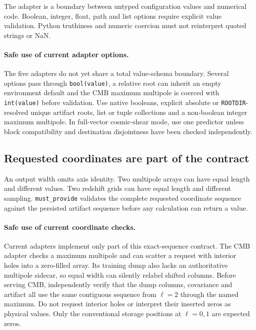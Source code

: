\documentclass[10pt,aps,prd,twocolumn,nofootinbib]{revtex4-2}
\newcommand{\code}[1]{\texttt{#1}}
\begin{document}
The adapter is a boundary between untyped configuration values and numerical
code.  Boolean, integer, float, path and list options require explicit value
validation.  Python truthiness and numeric coercion must not reinterpret quoted
strings or NaN.

\paragraph{Safe use of current adapter options.}
The five adapters do not yet share a total value-schema boundary.  Several
options pass through \code{bool(value)}, a relative root can inherit an empty
environment default and the CMB maximum multipole is coerced with
\code{int(value)} before validation.  Use native booleans, explicit absolute or
\code{ROOTDIR}-resolved unique artifact roots, list or tuple collections and a
non-boolean integer maximum multipole.  In full-vector cosmic-shear mode, use
one predictor unless block compatibility and destination disjointness have
been checked independently.

\subsection{Requested coordinates are part of the contract}

An output width omits axis identity.  Two multipole arrays can have equal length
and different values.  Two redshift grids can have equal length and different
sampling.  \code{must\_provide} validates the complete requested coordinate
sequence against the persisted artifact sequence before any calculation can
return a value.

\paragraph{Safe use of current coordinate checks.}
Current adapters implement only part of this exact-sequence contract.  The CMB
adapter checks a maximum multipole and can scatter a request with interior
holes into a zero-filled array.  Its training dump also lacks an authoritative
multipole sidecar, so equal width can silently relabel shifted columns.  Before
serving CMB, independently verify that the dump columns, covariance and
artifact all use the same contiguous sequence from $\ell=2$ through the named
maximum.  Do not request interior holes or interpret their inserted zeros as
physical values.  Only the conventional storage positions at $\ell=0,1$ are
expected zeros.
\end{document}
